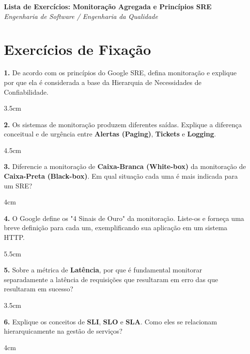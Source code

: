 \documentclass[12pt]{article}
\begin{document}

\begin{center}
  {\Large \textbf{Lista de Exercícios: Monitoração Agregada e Princípios SRE}}\\[0.2cm]
  \textit{Engenharia de Software / Engenharia da Qualidade}
\end{center}

\vspace{0.4cm}

\section*{Exercícios de Fixação}

\textbf{1.} De acordo com os princípios do Google SRE, defina monitoração e explique por que ela é considerada a base da Hierarquia de Necessidades de Confiabilidade.
\begin{resposta}{3.5cm}
\end{resposta}

\textbf{2.} Os sistemas de monitoração produzem diferentes saídas. Explique a diferença conceitual e de urgência entre \textbf{Alertas (Paging)}, \textbf{Tickets} e \textbf{Logging}.
\begin{resposta}{4.5cm}
\end{resposta}

\textbf{3.} Diferencie a monitoração de \textbf{Caixa-Branca (White-box)} da monitoração de \textbf{Caixa-Preta (Black-box)}. Em qual situação cada uma é mais indicada para um SRE?
\begin{resposta}{4cm}
\end{resposta}

\textbf{4.} O Google define os "4 Sinais de Ouro" da monitoração. Liste-os e forneça uma breve definição para cada um, exemplificando sua aplicação em um sistema HTTP.
\begin{resposta}{5.5cm}
\end{resposta}

\textbf{5.} Sobre a métrica de \textbf{Latência}, por que é fundamental monitorar separadamente a latência de requisições que resultaram em erro das que resultaram em sucesso?
\begin{resposta}{3.5cm}
\end{resposta}

\textbf{6.} Explique os conceitos de \textbf{SLI}, \textbf{SLO} e \textbf{SLA}. Como eles se relacionam hierarquicamente na gestão de serviços?
\begin{resposta}{4cm}
\end{resposta}
\end{document}
